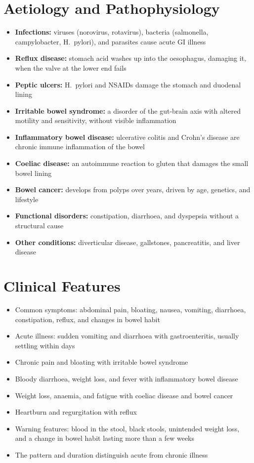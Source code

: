 \section*{Aetiology and Pathophysiology}
\begin{itemize}
    \item \textbf{Infections:} viruses (norovirus, rotavirus), bacteria (salmonella, campylobacter, H.\ pylori), and parasites cause acute GI illness
    \item \textbf{Reflux disease:} stomach acid washes up into the oesophagus, damaging it, when the valve at the lower end fails
    \item \textbf{Peptic ulcers:} H.\ pylori and NSAIDs damage the stomach and duodenal lining
    \item \textbf{Irritable bowel syndrome:} a disorder of the gut-brain axis with altered motility and sensitivity, without visible inflammation
    \item \textbf{Inflammatory bowel disease:} ulcerative colitis and Crohn's disease are chronic immune inflammation of the bowel
    \item \textbf{Coeliac disease:} an autoimmune reaction to gluten that damages the small bowel lining
    \item \textbf{Bowel cancer:} develops from polyps over years, driven by age, genetics, and lifestyle
    \item \textbf{Functional disorders:} constipation, diarrhoea, and dyspepsia without a structural cause
    \item \textbf{Other conditions:} diverticular disease, gallstones, pancreatitis, and liver disease
\end{itemize}

\section*{Clinical Features}
\begin{itemize}
    \item Common symptoms: abdominal pain, bloating, nausea, vomiting, diarrhoea, constipation, reflux, and changes in bowel habit
    \item Acute illness: sudden vomiting and diarrhoea with gastroenteritis, usually settling within days
    \item Chronic pain and bloating with irritable bowel syndrome
    \item Bloody diarrhoea, weight loss, and fever with inflammatory bowel disease
    \item Weight loss, anaemia, and fatigue with coeliac disease and bowel cancer
    \item Heartburn and regurgitation with reflux
    \item Warning features: blood in the stool, black stools, unintended weight loss, and a change in bowel habit lasting more than a few weeks
    \item The pattern and duration distinguish acute from chronic illness
\end{itemize}

